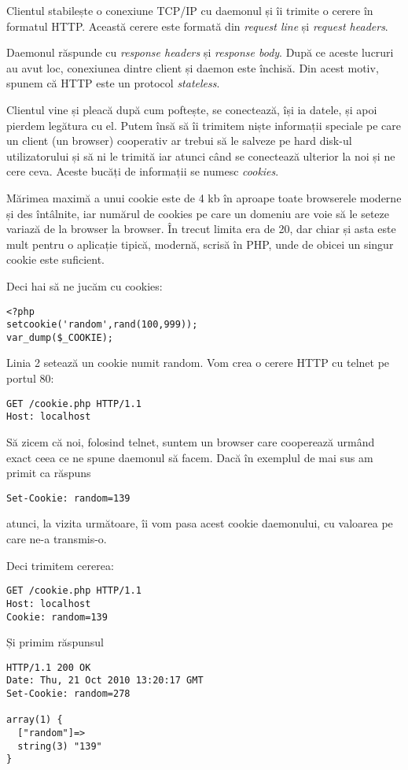 Clientul stabilește o conexiune TCP/IP cu daemonul și \^ii
trimite o cerere \^in formatul HTTP. Această cerere
este formată din \textit{request line} și \textit{request headers}.

Daemonul răspunde cu \textit{response headers} și \textit{response body}.
După ce aceste lucruri au avut loc, conexiunea dintre client și daemon
este \^inchisă. Din acest motiv, spunem că HTTP este un protocol \textsl{stateless}.

Clientul vine și pleacă după cum poftește, se conectează, \^iși ia datele,
și apoi pierdem legătura cu el. Putem \^insă să \^ii trimitem niște informații {\glqq}speciale{\grqq}
pe care un client (un browser) cooperativ ar trebui să le salveze pe hard disk-ul
utilizatorului și să ni le trimită iar atunci c\^and se conectează ulterior
la noi și ne cere ceva. Aceste bucăți de informații se numesc \textsl{cookies}.

Mărimea maximă a unui cookie este de 4 kb \^in aproape toate browserele moderne și
des \^int\^alnite, iar numărul de cookies pe care un domeniu are voie să
le seteze variază de la browser la browser. \^In trecut limita era de
20, dar chiar și asta este mult pentru o aplicație tipică,
modernă, scrisă \^in PHP,
unde de obicei un singur cookie este suficient.

Deci hai să ne jucăm cu cookies:

\begin{lstlisting}[title=Folosirea cookie-urilor]
<?php
setcookie('random',rand(100,999));
var_dump($_COOKIE);
\end{lstlisting}

Linia 2 setează un cookie numit {\glqq}random{\grqq}.
Vom crea o cerere HTTP cu telnet pe portul 80:
\begin{verbatim}
GET /cookie.php HTTP/1.1
Host: localhost

\end{verbatim}

Să zicem că noi, folosind telnet, suntem un browser care cooperează urm\^and
exact ceea ce ne spune daemonul să facem.
Dacă \^in exemplul de mai sus am primit ca răspuns
\begin{verbatim}
Set-Cookie: random=139
\end{verbatim}
atunci, la vizita următoare, \^ii vom pasa acest cookie daemonului,
cu valoarea pe care ne-a transmis-o.

Deci trimitem cererea:
\begin{verbatim}
GET /cookie.php HTTP/1.1
Host: localhost
Cookie: random=139

\end{verbatim} 
Și primim răspunsul
\begin{verbatim}
HTTP/1.1 200 OK
Date: Thu, 21 Oct 2010 13:20:17 GMT
Set-Cookie: random=278

array(1) {
  ["random"]=>
  string(3) "139"
}
\end{verbatim} 

